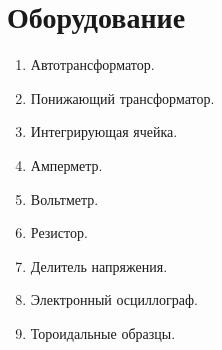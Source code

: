 \section*{Оборудование}

\begin{enumerate}
	\item Автотрансформатор.
	
	\item Понижающий трансформатор.
	
	\item Интегрирующая ячейка.
	
	\item Амперметр.
	
	\item Вольтметр.
	
	\item Резистор.
	
	\item Делитель напряжения.
	
	\item Электронный осциллограф.
	
	\item Тороидальные образцы.
\end{enumerate}